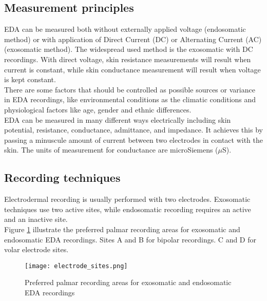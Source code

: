 \subsection{Measurement principles}
EDA can be measured both without externally applied voltage (endosomatic method) or with application of Direct Current (DC) or Alternating Current (AC) (exosomatic method). The widespread used method is the exosomatic with DC recordings. With direct voltage, skin resistance measurements will result when current is constant, while skin conductance measurement will result when voltage is kept constant.
\\ \indent
There are some factors that should be controlled as possible sources or variance in EDA recordings, like environmental conditions as the climatic conditions and physiological factors like age, gender and ethnic differences.
\\ \indent
EDA can be measured in many different ways electrically including skin potential, resistance, conductance, admittance, and impedance. It achieves this by passing a minuscule amount of current between two electrodes in contact with the skin. The units of measurement for conductance are microSiemens ($\mu$S).

\subsection{Recording techniques}
Electrodermal recording is usually performed with two electrodes. Exosomatic techniques use two active sites, while endosomatic recording requires an active and an inactive site.
\\
Figure \ref{fig:electrode_sites} illustrate the preferred palmar recording areas for exosomatic and endosomatic EDA recordings. Sites A and B for bipolar recordings. C and D for volar electrode sites.
\begin{figure}[h]
    \centering
    \texttt{[image: electrode\_sites.png]} 
	\caption{Preferred palmar recording areas for exosomatic and endosomatic EDA recordings}
    \label{fig:electrode_sites}
\end{figure}

